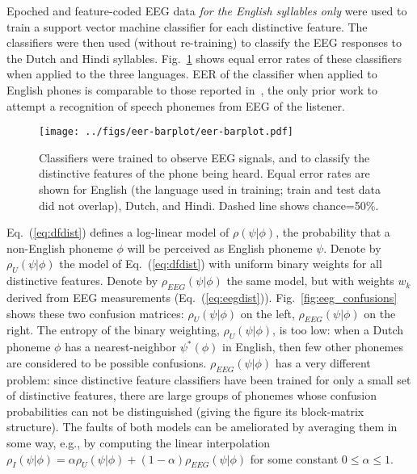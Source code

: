 \label{ssec:eeg}

\newcommand{\specialcell}[2][c]{%
  \begin{tabular}[#1]{@{}c@{}}#2\end{tabular}}

Epoched and feature-coded EEG data {\em for the English syllables
only} were used to train a support vector machine classifier for each
distinctive feature.  The classifiers were then used (without
re-training) to classify the EEG responses to the Dutch and Hindi
syllables.  Fig.~\ref{fig:eeg_svm_eers} shows equal error rates of
these classifiers when applied to the three languages.  {\color{blue}
EER of the classifier when applied to English phones is comparable to
those reported in~\cite{Liberto15}, the only prior work to attempt a
recognition of speech phonemes from EEG of the listener.}

\begin{figure}
  \centerline{\texttt{[image: ../figs/eer-barplot/eer-barplot.pdf]}}
  \vspace*{-0.3cm}
  \caption{Classifiers were trained to observe EEG signals, and to
    classify the distinctive features of the phone being heard.  Equal
    error rates are shown for English (the language used in training;
    train and test data did not overlap), Dutch, and Hindi.  Dashed
    line shows chance=50\%.}
  \label{fig:eeg_svm_eers}
\end{figure}

Eq.~(\ref{eq:dfdist}) defines a log-linear model of $\rho(\psi|\phi)$,
the probability that a non-English phoneme $\phi$ will be perceived as
English phoneme $\psi$.  Denote by $\rho_U(\psi|\phi)$ the model of
Eq.~(\ref{eq:dfdist}) with uniform binary weights for all distinctive
features. Denote by
$\rho_{EEG}(\psi|\phi)$ the same model, but with weights $w_k$ derived
from EEG measurements (Eq.~(\ref{eq:eegdist})).
Fig.~\ref{fig:eeg_confusions} shows these two confusion matrices:
$\rho_U(\psi|\phi)$ on the left, $\rho_{EEG}(\psi|\phi)$ on the
right. The entropy of the binary weighting, $\rho_U(\psi|\phi)$, is
too low: when a Dutch phoneme $\phi$ has a nearest-neighbor
$\psi^*(\phi)$ in English, then few other phonemes are considered to
be possible confusions.  $\rho_{EEG}(\psi|\phi)$ has a very different
problem: since distinctive feature classifiers have been trained for
only a small set of distinctive features, there are large groups of
phonemes whose confusion probabilities can not be distinguished
(giving the figure its block-matrix structure).  The faults of both
models can be ameliorated by averaging them in some way, e.g., by
computing the linear interpolation
$\rho_I(\psi|\phi)=\alpha\rho_U(\psi|\phi)+(1-\alpha)\rho_{EEG}(\psi|\phi)$ for
some constant $0\le\alpha\le 1$.

